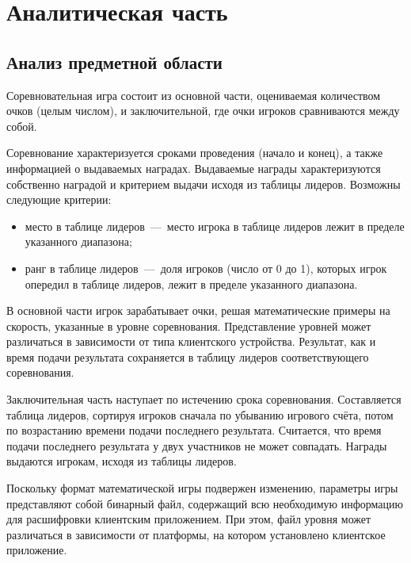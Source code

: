 \chapter{Аналитическая часть}

\section{Анализ предметной области}

Соревновательная игра состоит из основной части, оцениваемая количеством очков (целым числом), и заключительной, где очки игроков сравниваются между собой.

Соревнование характеризуется сроками проведения (начало и конец), а также информацией о выдаваемых наградах. Выдаваемые награды характеризуются собственно наградой и критерием выдачи исходя из таблицы лидеров. Возможны следующие критерии:
\begin{itemize}
	\item место в таблице лидеров~---~место игрока в таблице лидеров лежит в пределе указанного диапазона;
	\item ранг в таблице лидеров~---~доля игроков (число от 0 до 1), которых игрок опередил в таблице лидеров, лежит в пределе указанного диапазона.
\end{itemize}


В основной части игрок зарабатывает очки, решая математические примеры на скорость, указанные в уровне соревнования. Представление уровней может различаться в зависимости от типа клиентского устройства. Результат, как и время подачи результата сохраняется в таблицу лидеров соответствующего соревнования.

Заключительная часть наступает по истечению срока соревнования. Составляется таблица лидеров, сортируя игроков сначала по убыванию игрового счёта, потом по возрастанию времени подачи последнего результата. Считается, что время подачи последнего результата у двух участников не может совпадать. Награды выдаются игрокам, исходя из таблицы лидеров. 

Поскольку формат математической игры подвержен изменению, параметры игры представляют собой бинарный файл, содержащий всю необходимую информацию для расшифровки клиентским приложением. При этом, файл уровня может различаться в зависимости от платформы, на котором установлено клиентское приложение.

